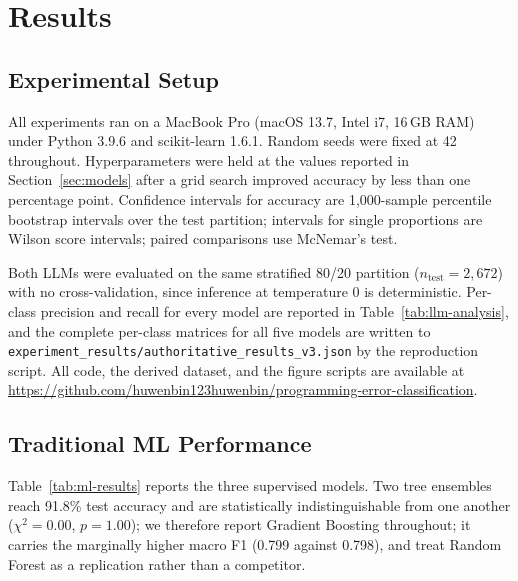 \documentclass[acmsmall]{acmart}
\begin{document}
\section{Results}

\subsection{Experimental Setup}

All experiments ran on a MacBook Pro (macOS 13.7, Intel i7, 16\,GB RAM) under
Python 3.9.6 and scikit-learn 1.6.1. Random seeds were fixed at 42 throughout.
Hyperparameters were held at the values reported in Section~\ref{sec:models}
after a grid search improved accuracy by less than one percentage point.
Confidence intervals for accuracy are 1{,}000-sample percentile bootstrap
intervals over the test partition; intervals for single proportions are Wilson
score intervals; paired comparisons use McNemar's test.

Both LLMs were evaluated on the same stratified 80/20 partition
($n_{\text{test}}=2{,}672$) with no cross-validation, since inference at
temperature 0 is deterministic. Per-class precision and recall for every model
are reported in Table~\ref{tab:llm-analysis}, and the complete per-class matrices
for all five models are written to
\texttt{experiment\_results/authoritative\_results\_v3.json} by the reproduction
script. All code, the derived dataset, and the figure scripts are available
at \url{https://github.com/huwenbin123huwenbin/programming-error-classification}.

\subsection{Traditional ML Performance}

Table~\ref{tab:ml-results} reports the three supervised models. Two tree
ensembles reach 91.8\% test accuracy and are statistically indistinguishable
from one another ($\chi^2=0.00$, $p=1.00$); we therefore report Gradient
Boosting throughout; it carries the marginally higher macro F1 (0.799 against
0.798), and treat Random Forest as a replication rather than a
competitor.
\end{document}
